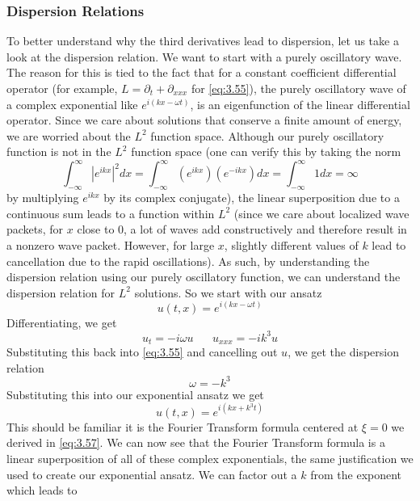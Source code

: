 \documentclass{article}
\numberwithin{equation}{section}
\begin{document}
\subsubsection{Dispersion Relations}
To better understand why the third derivatives lead to dispersion, let us take a look at the dispersion relation. We want to start with a purely oscillatory wave. The reason for this is tied to the fact that for a constant coefficient differential operator (for example, $L = \partial_t+\partial_{xxx}$ for \eqref{eq:3.55}), the purely oscillatory wave of a complex exponential like $e^{i(kx-\omega t)}$, is an eigenfunction of the linear differential operator. Since we care about solutions that conserve a finite amount of energy, we are worried about the $L^2$ function space. Although our purely oscillatory function is not in the $L^2$ function space (one can verify this by taking the norm 
\begin{equation*}
    \int^\infty_{-\infty}|e^{ikx}|^2dx = \int^\infty_{-\infty}(e^{ikx})(e^{-ikx})dx = \int^\infty_{-\infty}1dx = \infty
\end{equation*}
by multiplying $e^{ikx}$ by its complex conjugate), the linear superposition due to a continuous sum leads to a function within $L^2$ (since we care about localized wave packets, for $x$ close to 0, a lot of waves add constructively and therefore result in a nonzero wave packet. However, for large $x$, slightly different values of $k$ lead to cancellation due to the rapid oscillations). As such, by understanding the dispersion relation using our purely oscillatory function, we can understand the dispersion relation for $L^2$ solutions. So we start with our ansatz
\begin{equation*}
    u(t,x) = e^{i(kx-\omega t)}
\end{equation*}
Differentiating, we get 
\begin{equation*}
    u_t = -i\omega u \hspace{20pt} u_{xxx} = -ik^3u
\end{equation*}
Substituting this back into \eqref{eq:3.55} and cancelling out $u$, we get the dispersion relation
\begin{equation}
    \omega = -k^3
\end{equation}
Substituting this into our exponential ansatz we get 
\begin{equation}
    u(t,x) = e^{i(kx+k^3t)} \label{eq:3.61}
\end{equation}
This should be familiar it is the Fourier Transform formula centered at $\xi=0$ we derived in \eqref{eq:3.57}. We can now see that the Fourier Transform formula is a linear superposition of all of these complex exponentials, the same justification we used to create our exponential ansatz. We can factor out a $k$ from the exponent which leads to 
\end{document}

